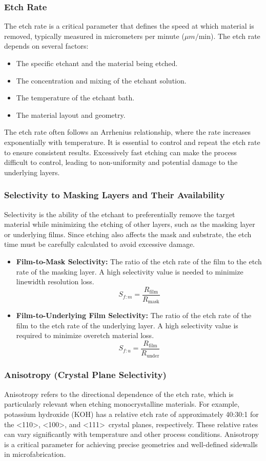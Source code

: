 \documentclass{report}
\begin{document}
\subsubsection{Etch Rate}
The etch rate is a critical parameter that defines the speed at which material is removed, typically measured in micrometers per minute ($\mu m/\text{min}$). The etch rate depends on several factors:
\begin{itemize}
    \item The specific etchant and the material being etched.
    \item The concentration and mixing of the etchant solution.
    \item The temperature of the etchant bath.
    \item The material layout and geometry.
\end{itemize}
The etch rate often follows an Arrhenius relationship, where the rate increases exponentially with temperature. It is essential to control and repeat the etch rate to ensure consistent results. Excessively fast etching can make the process difficult to control, leading to non-uniformity and potential damage to the underlying layers.

\subsubsection{Selectivity to Masking Layers and Their Availability}
Selectivity is the ability of the etchant to preferentially remove the target material while minimizing the etching of other layers, such as the masking layer or underlying films. Since etching also affects the mask and substrate, the etch time must be carefully calculated to avoid excessive damage.

\begin{itemize}
    \item \textbf{Film-to-Mask Selectivity:} The ratio of the etch rate of the film to the etch rate of the masking layer. A high selectivity value is needed to minimize linewidth resolution loss.
    $$S_{f:m} = \frac{R_{\text{film}}}{R_{\text{mask}}}$$
    \item \textbf{Film-to-Underlying Film Selectivity:} The ratio of the etch rate of the film to the etch rate of the underlying layer. A high selectivity value is required to minimize overetch material loss.
    $$S_{f:u} = \frac{R_{\text{film}}}{R_{\text{under}}}$$
\end{itemize}

\subsubsection{Anisotropy (Crystal Plane Selectivity)}
Anisotropy refers to the directional dependence of the etch rate, which is particularly relevant when etching monocrystalline materials. For example, potassium hydroxide (KOH) has a relative etch rate of approximately 40:30:1 for the \textless 110\textgreater, \textless 100\textgreater, and \textless 111\textgreater\ crystal planes, respectively. These relative rates can vary significantly with temperature and other process conditions. Anisotropy is a critical parameter for achieving precise geometries and well-defined sidewalls in microfabrication.
\end{document}

